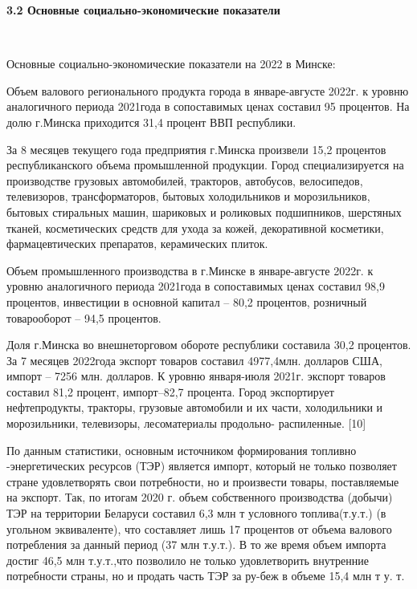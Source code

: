 \documentclass[14pt,a4paper]{article}
\begin{document}
    \begin{center}
        \textbf{3.2 Основные социально-экономические показатели}
    \end{center}
    \\
    \par
    Основные социально-экономические показатели на 2022 в Минске:
    \par
    Объем валового регионального продукта города в январе-августе 2022г. к уровню аналогичного периода 2021года в сопоставимых ценах составил 95 процентов.
    На долю г.Минска приходится 31,4 процент ВВП республики.
    \par
    За 8 месяцев текущего года предприятия г.Минска произвели 15,2 процентов республиканского объема промышленной продукции.
    Город специализируется на производстве грузовых автомобилей, тракторов, автобусов, велосипедов, телевизоров, трансформаторов, бытовых холодильников и морозильников, бытовых стиральных машин, шариковых и роликовых подшипников, шерстяных тканей, косметических средств для ухода за кожей, декоративной косметики, фармацевтических препаратов, керамических плиток.
    \par
    Объем промышленного производства в г.Минске в январе-августе 2022г. к уровню аналогичного периода 2021года в сопоставимых ценах составил 98,9 процентов, инвестиции в основной капитал – 80,2 процентов, розничный товарооборот – 94,5 процентов.
    \par
    Доля г.Минска во внешнеторговом обороте республики составила 30,2 процентов.
    За 7 месяцев 2022года экспорт товаров составил 4977,4млн. долларов США, импорт – 7256 млн. долларов. К уровню января-июля 2021г. экспорт товаров составил 81,2 процент, импорт–82,7 процента.
    Город экспортирует нефтепродукты, тракторы, грузовые автомобили и их части, холодильники и морозильники, телевизоры, лесоматериалы продольно- распиленные. [10]
    \par
    По данным статистики, основным источником формирования топливно\\-энергетических ресурсов (ТЭР)
    является импорт, который не только позволяет стране удовлетворять свои потребности, но и произвести товары, поставляемые на экспорт.
    Так, по итогам 2020 г. объем собственного производства (добычи) ТЭР на территории Беларуси составил 6,3 млн т условного топлива(т.у.т.) (в угольном эквиваленте), что составляет лишь 17 процентов от объема валового потребления за данный период (37 млн т.у.т.).
    В то же время объем импорта достиг 46,5 млн т.у.т.,что позволило не только удовлетворить внутренние потребности страны, но и продать часть ТЭР за ру-беж в объеме 15,4 млн т у. т.
\end{document}
